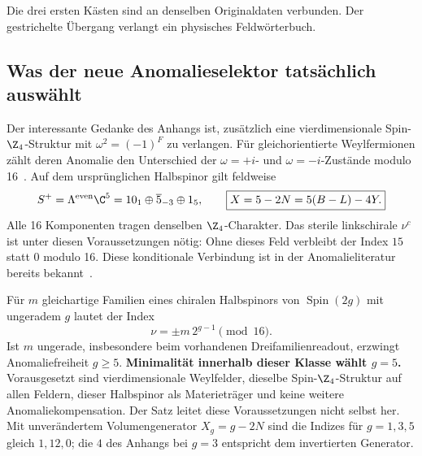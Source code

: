 \begin{center}
\end{center}
Die drei ersten Kästen sind an denselben Originaldaten verbunden. Der gestrichelte Übergang verlangt ein physisches Feldwörterbuch.

\subsection{Was der neue Anomalieselektor tatsächlich auswählt}
Der interessante Gedanke des Anhangs ist, zusätzlich eine vierdimensionale Spin-$\Z_4$-Struktur mit $\omega^2=(-1)^F$ zu verlangen. Für gleichorientierte Weylfermionen zählt deren Anomalie den Unterschied der $\omega=+i$- und $\omega=-i$-Zustände modulo 16~\cite[Abschnitt 3, Gleichung (7)]{razamattong}. Auf dem ursprünglichen Halbspinor gilt feldweise
\begin{equation}
S^+=\Lambda^{\rm even}\C^5=10_1\oplus\overline5_{-3}\oplus1_5,\qquad
\boxed{X=5-2N=5(B-L)-4Y.}
\end{equation}
Alle 16 Komponenten tragen denselben $\Z_4$-Charakter. Das sterile linkschirale $\nu^c$ ist unter diesen Voraussetzungen nötig: Ohne dieses Feld verbleibt der Index $15$ statt $0$ modulo 16. Diese konditionale Verbindung ist in der Anomalieliteratur bereits bekannt~\cite[Abschnitt 4.3]{garciamontero}.

Für $m$ gleichartige Familien eines chiralen Halbspinors von $\operatorname{Spin}(2g)$ mit ungeradem $g$ lautet der Index
\begin{equation}
\nu=\pm m\,2^{g-1}\pmod{16}.
\end{equation}
Ist $m$ ungerade, insbesondere beim vorhandenen Dreifamilienreadout, erzwingt Anomaliefreiheit $g\ge5$. \textbf{Minimalität innerhalb dieser Klasse wählt $g=5$.} Vorausgesetzt sind vierdimensionale Weylfelder, dieselbe Spin-$\Z_4$-Struktur auf allen Feldern, dieser Halbspinor als Materieträger und keine weitere Anomaliekompensation. Der Satz leitet diese Voraussetzungen nicht selbst her. Mit unverändertem Volumengenerator $X_g=g-2N$ sind die Indizes für $g=1,3,5$ gleich $1,12,0$; die $4$ des Anhangs bei $g=3$ entspricht dem invertierten Generator.

